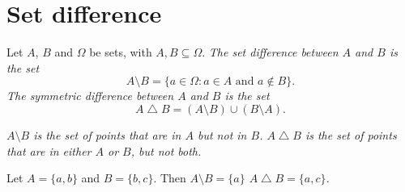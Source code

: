\section{Set difference}
\begin{definition}
Let $A$, $B$ and $\Omega$ be sets, with $A,B\subseteq \Omega$.
\ben
\it The \emph{set difference} between $A$ and $B$ is the set
$$
A\setminus B = \{a\in \Omega : a\in A \text{ and } a\notin B\}. %
$$
\it The \emph{symmetric difference} between $A$ and $B$ is the set 
$$
A\bigtriangleup B = (A\setminus B) \cup (B\setminus A). %
$$
\een
\end{definition}

\bit
\it $A\setminus B$ is the set of points that are in $A$ but not in $B$.
\it $A\bigtriangleup B$ is the set of points that are in either $A$ or $B$, but not both.
\eit

\begin{example}
Let $A=\{a,b\}$ and $B=\{b,c\}$. Then
\bit
\it $A\setminus B = \{a\}$
\it $A\bigtriangleup B = \{a,c\}$.
\eit
\end{example}

